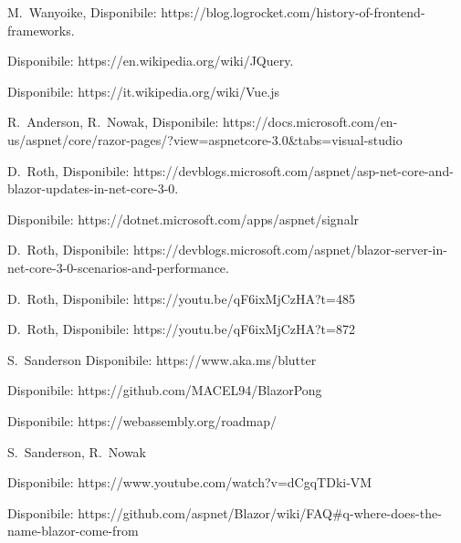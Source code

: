 \begin{thebibliography}{999}

M.~Wanyoike,
Disponibile: https://blog.logrocket.com/history-of-frontend-frameworks.

Disponibile: https://en.wikipedia.org/wiki/JQuery.

Disponibile: https://it.wikipedia.org/wiki/Vue.js

R.~Anderson,
R.~Nowak,
Disponibile: https://docs.microsoft.com/en-us/aspnet/core/razor-pages/?view=aspnetcore-3.0\&tabs=visual-studio

D.~Roth,
Disponibile: https://devblogs.microsoft.com/aspnet/asp-net-core-and-blazor-updates-in-net-core-3-0.

Disponibile: https://dotnet.microsoft.com/apps/aspnet/signalr

D.~Roth,
Disponibile: https://devblogs.microsoft.com/aspnet/blazor-server-in-net-core-3-0-scenarios-and-performance.

D.~Roth,
Disponibile:
https://youtu.be/qF6ixMjCzHA?t=485

D.~Roth,
Disponibile: https://youtu.be/qF6ixMjCzHA?t=872

S.~Sanderson
Disponibile: https://www.aka.ms/blutter

Disponibile: https://github.com/MACEL94/BlazorPong

Disponibile: https://webassembly.org/roadmap/

S.~Sanderson, R.~Nowak

Disponibile: https://www.youtube.com/watch?v=dCgqTDki-VM

Disponibile: https://github.com/aspnet/Blazor/wiki/FAQ\#q-where-does-the-name-blazor-come-from





\end{thebibliography}
